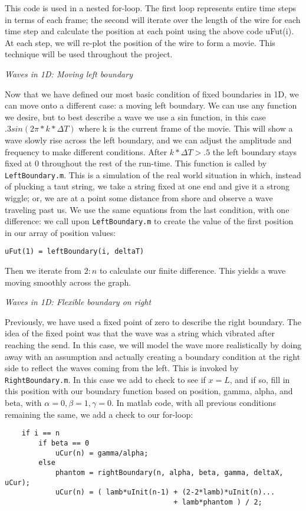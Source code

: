 \documentclass[12pt]{article}
\begin{document}
\begin{enumerate}
This code is used in a nested for-loop.  The first loop represents entire time steps in terms of each frame; the second will iterate over the length of the wire for each time step and calculate the position at each point using the above code uFut(i).  At each step, we will re-plot the position of the wire to form a movie.  This technique will be used throughout the project.  

\large{\item\textit{Waves in 1D:  Moving left boundary}

\normalsize{Now that we have defined our most basic condition of fixed boundaries in 1D, we can move onto a different case: a moving left boundary.  We can use any function we desire, but to best describe a wave we use a sin function, in this case $.3sin(2\pi * k * \Delta T)$ where k is the current frame of the movie.  This will show a wave slowly rise across the left boundary, and we can adjust the amplitude and frequency to make different conditions. After $k*\Delta T>.5$ the left boundary stays fixed at 0 throughout the rest of the run-time. This function is called by \texttt{LeftBoundary.m}.  This is a simulation of the real world situation in which, instead of plucking a taut string, we take a string fixed at one end and give it a strong wiggle; or, we are at a point some distance from shore and observe a wave traveling past us.  We use the same equations from the last condition, with one difference: we call upon \texttt{LeftBoundary.m} to create the value of the first position in our array of position values:}

\begin{verbatim}
uFut(1) = leftBoundary(i, deltaT)
\end{verbatim}
Then we iterate from $2:n$ to calculate our finite difference.  This yields a wave moving smoothly across the graph.

\large{\item\textit{Waves in 1D:  Flexible boundary on right}}

\normalsize{Previously, we have used a fixed point of zero to describe the right boundary.  The idea of the fixed point was that the wave was a string which vibrated after reaching the send. In this case, we will model the wave more realistically by doing away with an assumption and actually creating a boundary condition at the right side to reflect the waves coming from the left.  This is invoked by \texttt{RightBoundary.m}.  In this case we add to check to see if $x = L$, and if so, fill in this position with our boundary function based on position, gamma, alpha, and beta, with $\alpha =0, \beta=1, \gamma = 0$. In matlab code, with all previous conditions remaining the same, we add a check to our for-loop: }
\begin{verbatim}
    if i == n
        if beta == 0
            uCur(n) = gamma/alpha;
        else
            phantom = rightBoundary(n, alpha, beta, gamma, deltaX, uCur);
            uCur(n) = ( lamb*uInit(n-1) + (2-2*lamb)*uInit(n)...
                                        + lamb*phantom ) / 2;
\end{verbatim}

}
\end{enumerate}
\end{document}
